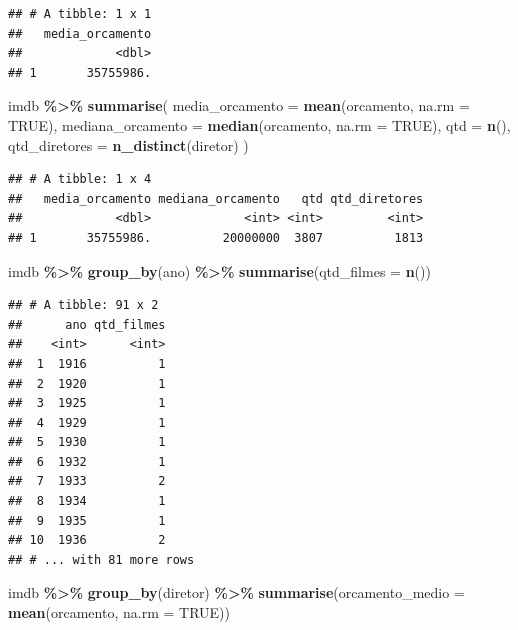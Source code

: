 \documentclass[
]{book}
\newenvironment{Shaded}{\begin{snugshade}}{\end{snugshade}}
\newcommand{\DataTypeTok}[1]{\textcolor[rgb]{0.13,0.29,0.53}{#1}}
\newcommand{\KeywordTok}[1]{\textcolor[rgb]{0.13,0.29,0.53}{\textbf{#1}}}
\newcommand{\NormalTok}[1]{#1}
\newcommand{\OperatorTok}[1]{\textcolor[rgb]{0.81,0.36,0.00}{\textbf{#1}}}
\newcommand{\OtherTok}[1]{\textcolor[rgb]{0.56,0.35,0.01}{#1}}
\newcommand{\StringTok}[1]{\textcolor[rgb]{0.31,0.60,0.02}{#1}}
\begin{document}
\begin{verbatim}
## # A tibble: 1 x 1
##   media_orcamento
##             <dbl>
## 1       35755986.
\end{verbatim}

\begin{Shaded}
\begin{Highlighting}[]
\NormalTok{imdb }\OperatorTok{\%>\%}
\StringTok{  }\KeywordTok{summarise}\NormalTok{(}
    \DataTypeTok{media\_orcamento =} \KeywordTok{mean}\NormalTok{(orcamento, }\DataTypeTok{na.rm =} \OtherTok{TRUE}\NormalTok{),}
    \DataTypeTok{mediana\_orcamento =} \KeywordTok{median}\NormalTok{(orcamento, }\DataTypeTok{na.rm =} \OtherTok{TRUE}\NormalTok{),}
    \DataTypeTok{qtd =} \KeywordTok{n}\NormalTok{(),}
    \DataTypeTok{qtd\_diretores =} \KeywordTok{n\_distinct}\NormalTok{(diretor)}
\NormalTok{  )}
\end{Highlighting}
\end{Shaded}

\begin{verbatim}
## # A tibble: 1 x 4
##   media_orcamento mediana_orcamento   qtd qtd_diretores
##             <dbl>             <int> <int>         <int>
## 1       35755986.          20000000  3807          1813
\end{verbatim}

\begin{Shaded}
\begin{Highlighting}[]
\NormalTok{imdb }\OperatorTok{\%>\%}
\StringTok{  }\KeywordTok{group\_by}\NormalTok{(ano) }\OperatorTok{\%>\%}
\StringTok{  }\KeywordTok{summarise}\NormalTok{(}\DataTypeTok{qtd\_filmes =} \KeywordTok{n}\NormalTok{())}
\end{Highlighting}
\end{Shaded}

\begin{verbatim}
## # A tibble: 91 x 2
##      ano qtd_filmes
##    <int>      <int>
##  1  1916          1
##  2  1920          1
##  3  1925          1
##  4  1929          1
##  5  1930          1
##  6  1932          1
##  7  1933          2
##  8  1934          1
##  9  1935          1
## 10  1936          2
## # ... with 81 more rows
\end{verbatim}

\begin{Shaded}
\begin{Highlighting}[]
\NormalTok{imdb }\OperatorTok{\%>\%}
\StringTok{  }\KeywordTok{group\_by}\NormalTok{(diretor) }\OperatorTok{\%>\%}
\StringTok{  }\KeywordTok{summarise}\NormalTok{(}\DataTypeTok{orcamento\_medio =} \KeywordTok{mean}\NormalTok{(orcamento, }\DataTypeTok{na.rm =} \OtherTok{TRUE}\NormalTok{))}
\end{Highlighting}
\end{Shaded}
\end{document}
